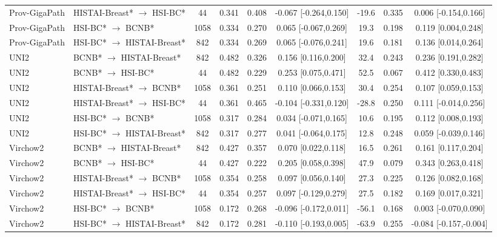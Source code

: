 \begin{table}[htbp]
{\begin{tabular}{l l c c c c c c c}
Prov-GigaPath & HISTAI-Breast* $\rightarrow$ HSI-BC* & 44 & 0.341 & 0.408 & -0.067 [-0.264,0.150] & -19.6 & 0.335 & 0.006 [-0.154,0.166] \\
Prov-GigaPath & HSI-BC* $\rightarrow$ BCNB* & 1058 & 0.334 & 0.270 & 0.065 [-0.067,0.269] & 19.3 & 0.198 & 0.119 [0.004,0.248] \\
Prov-GigaPath & HSI-BC* $\rightarrow$ HISTAI-Breast* & 842 & 0.334 & 0.269 & 0.065 [-0.076,0.241] & 19.6 & 0.181 & 0.136 [0.014,0.264] \\
UNI2 & BCNB* $\rightarrow$ HISTAI-Breast* & 842 & 0.482 & 0.326 & 0.156 [0.116,0.200] & 32.4 & 0.243 & 0.236 [0.191,0.282] \\
UNI2 & BCNB* $\rightarrow$ HSI-BC* & 44 & 0.482 & 0.229 & 0.253 [0.075,0.471] & 52.5 & 0.067 & 0.412 [0.330,0.483] \\
UNI2 & HISTAI-Breast* $\rightarrow$ BCNB* & 1058 & 0.361 & 0.251 & 0.110 [0.066,0.153] & 30.4 & 0.254 & 0.107 [0.059,0.153] \\
UNI2 & HISTAI-Breast* $\rightarrow$ HSI-BC* & 44 & 0.361 & 0.465 & -0.104 [-0.331,0.120] & -28.8 & 0.250 & 0.111 [-0.014,0.256] \\
UNI2 & HSI-BC* $\rightarrow$ BCNB* & 1058 & 0.317 & 0.284 & 0.034 [-0.071,0.165] & 10.6 & 0.195 & 0.112 [0.008,0.193] \\
UNI2 & HSI-BC* $\rightarrow$ HISTAI-Breast* & 842 & 0.317 & 0.277 & 0.041 [-0.064,0.175] & 12.8 & 0.248 & 0.059 [-0.039,0.146] \\
Virchow2 & BCNB* $\rightarrow$ HISTAI-Breast* & 842 & 0.427 & 0.357 & 0.070 [0.022,0.118] & 16.5 & 0.261 & 0.161 [0.117,0.204] \\
Virchow2 & BCNB* $\rightarrow$ HSI-BC* & 44 & 0.427 & 0.222 & 0.205 [0.058,0.398] & 47.9 & 0.079 & 0.343 [0.263,0.418] \\
Virchow2 & HISTAI-Breast* $\rightarrow$ BCNB* & 1058 & 0.354 & 0.258 & 0.097 [0.056,0.140] & 27.3 & 0.225 & 0.126 [0.082,0.168] \\
Virchow2 & HISTAI-Breast* $\rightarrow$ HSI-BC* & 44 & 0.354 & 0.257 & 0.097 [-0.129,0.279] & 27.5 & 0.182 & 0.169 [0.017,0.321] \\
Virchow2 & HSI-BC* $\rightarrow$ BCNB* & 1058 & 0.172 & 0.268 & -0.096 [-0.172,0.011] & -56.1 & 0.168 & 0.003 [-0.070,0.090] \\
Virchow2 & HSI-BC* $\rightarrow$ HISTAI-Breast* & 842 & 0.172 & 0.281 & -0.110 [-0.193,0.005] & -63.9 & 0.255 & -0.084 [-0.157,-0.004] \\
\bottomrule
\end{tabular}}%
\end{table}


